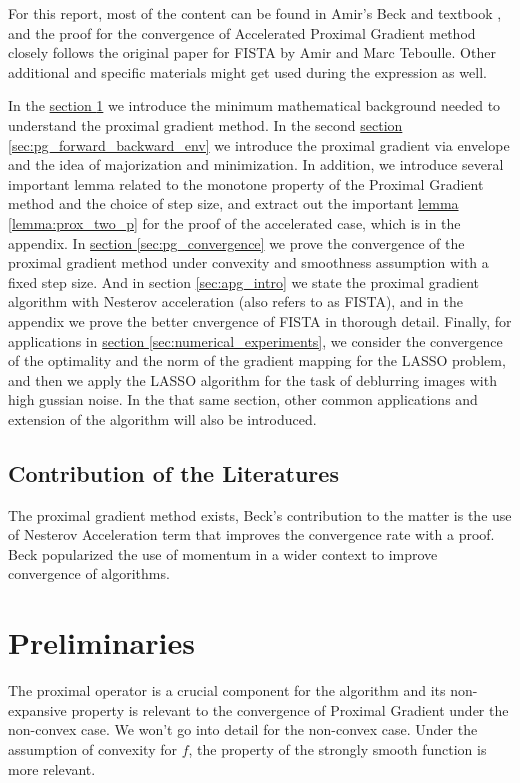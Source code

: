 \documentclass[]{article}
\theoremstyle{definition}
\begin{document}
    \par
    For this report, most of the content can be found in Amir's Beck and textbook \cite{book:first_order_opt}, and the proof for the convergence of Accelerated Proximal Gradient method closely follows the original paper for FISTA\cite{paper:FISTA} by Amir and Marc Teboulle. Other additional and specific materials might get used during the expression as well. 
    \par 
    In the \hyperref[sec:preliminaries]{section \ref*{sec:preliminaries}} we introduce the minimum mathematical background needed to understand the proximal gradient method. In the second \hyperref[sec:pg_forward_backward_env]{section \ref*{sec:pg_forward_backward_env}} we introduce the proximal gradient via envelope and the idea of majorization and minimization. In addition, we introduce several important lemma related to the monotone property of the Proximal Gradient method and the choice of step size, and extract out the important \hyperref[lemma:prox_two_p]{lemma \ref*{lemma:prox_two_p}} for the proof of the accelerated case, which is in the appendix. In \hyperref[sec:pg_convergence]{section \ref*{sec:pg_convergence}} we prove the convergence of the proximal gradient method under convexity and smoothness assumption with a fixed step size. And in section \ref*{sec:apg_intro} we state the proximal gradient algorithm with Nesterov acceleration (also refers to as FISTA), and in the appendix we prove the better cnvergence of FISTA in thorough detail. Finally, for applications in \hyperref[sec:numerical_experiments]{section \ref*{sec:numerical_experiments}}, we consider the convergence of the optimality and the norm of the gradient mapping for the LASSO problem, and then we apply the LASSO algorithm for the task of deblurring images with high gussian noise. In the that same section, other common applications and extension of the algorithm will also be introduced. 
    \subsection{Contribution of the Literatures}
        The proximal gradient method exists, Beck's contribution to the matter is the use of Nesterov Acceleration term that improves the convergence rate with a proof. Beck popularized the use of momentum in a wider context to improve convergence of algorithms. 
\section{Preliminaries}\label{sec:preliminaries}
    The proximal operator is a crucial component for the algorithm and its non-expansive  property is relevant to the convergence of Proximal Gradient under the non-convex case. We won't go into detail for the non-convex case. Under the assumption of convexity for $f$, the property of the strongly smooth function is more relevant. 
\end{document}
